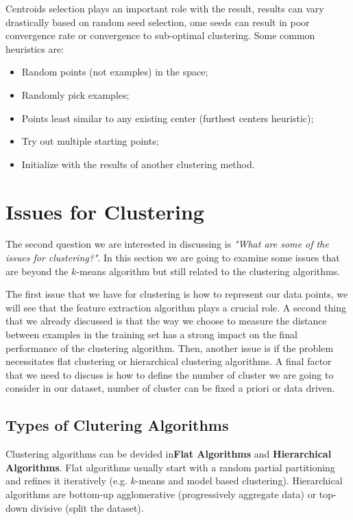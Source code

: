 Centroids selection plays an important role with the result, results can vary drastically based on random seed selection, ome seeds can result in poor convergence rate or convergence to sub-optimal clustering. Some common heuristics are:
\begin{itemize}[topsep={0pt}, partopsep={0pt}]
    \itemsep0pt
    \item Random points (not examples) in the space;
    \item Randomly pick examples;
    \item Points least similar to any existing center (furthest centers heuristic);
    \item Try out multiple starting points;
    \item Initialize with the results of another clustering method.
\end{itemize}

\section{Issues for Clustering}
The second question we are interested in discussing is \emph{"What are some of the issues for clustering?"}. In this section we are going to examine some issues that are beyond the \(k\)-means algorithm but still related to the clustering algorithms.

The first issue that we have for clustering is how to represent our data points, we will see that the feature extraction algorithm plays a crucial role. A second thing that we already discussed is that the way we choose to measure the distance between examples in the training set has a strong impact on the final performance of the clustering algorithm. Then, another issue is if the problem necessitates flat clustering or hierarchical clustering algorithms. A final factor that we need to discuss is how to define the number of cluster we are going to consider in our dataset, number of cluster can be fixed a priori or data driven.

\subsection{Types of Clutering Algorithms}
Clustering algorithms can be devided in\textbf{Flat Algorithms} and \textbf{Hierarchical Algorithms}. Flat algorithms usually start with a random partial partitioning and refines it iteratively (e.g. \(k\)-means and model based clustering). Hierarchical algorithms are bottom-up agglomerative (progressively aggregate data) or top-down divisive (split the dataset).

